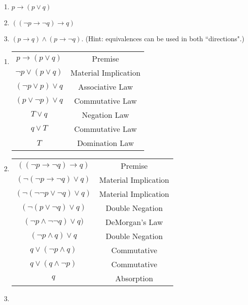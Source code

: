 \documentclass{article}
\begin{document}
\begin{enumerate}
    \begin{enumerate}
        \item $p \rightarrow (p \vee q)$
        \item $((\lnot p \rightarrow \lnot q) \rightarrow q)$
        \item $(p \rightarrow q) \wedge (p \rightarrow \lnot q)$. (Hint: equivalences can be used in both ``directions".)
    \end{enumerate}
    
    \begin{solution}
    \begin{enumerate}
        \item \begin{tabular}{c|c}
            $p \rightarrow (p \lor q)$ & Premise \\
            $\neg p \lor (p \lor q)$ & Material Implication \\
            $(\neg p \lor p) \lor q$ & Associative Law \\
            $(p \lor \neg p) \lor q$ & Commutative Law \\
            $T \lor q$ & Negation Law \\
            $q \lor T$ & Commutative Law \\
            $T$ & Domination Law \\
        \end{tabular}
        \item \begin{tabular}{c|c}
            $((\lnot p \rightarrow \lnot q) \rightarrow q)$ & Premise \\
            $(\neg(\lnot p \rightarrow \lnot q) \lor q)$ & Material Implication \\
            $(\neg(\neg \neg p \lor \neg q) \lor q)$ & Material Implication \\
            $(\neg(p \lor \neg q) \lor q)$ & Double Negation\\
            $(\neg p \land \neg \neg q) \lor q)$ & DeMorgan's Law\\
            $(\neg p \land q) \lor q$ & Double Negation\\
            $q \lor (\neg p \land q)$ & Commutative\\
            $q \lor (q \land \neg p)$ & Commutative\\
            $q $ & Absorption\\
        \end{tabular}
        \item
        \begin{tabular}{c|c}

\end{tabular}
\end{enumerate}
\end{solution}
\end{enumerate}
\end{document}
